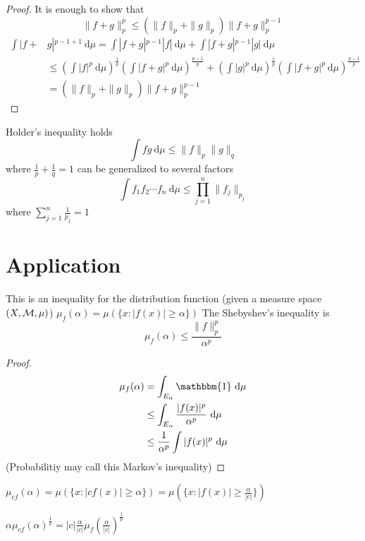 \begin{proof}
  It is enough to show that
  \[\|f+g\|_p^p \le (\|f\|_p + \|g\|_p)\|f+g\|_p^{p-1}\]
  \begin{align*}
    \int |f+&g|^{p-1+1} \ \mathrm{d}\mu = \int |f + g|^{p-1}|f|\ \mathrm{d}\mu + \int |f+g|^{p-1}|g|\ \mathrm{d}\mu \\
    &\le \left(\int |f|^{p}\ \mathrm{d}\mu\right)^{\frac{1}{p}}\left(\int |f+g|^p\ \mathrm{d}\mu\right)^{\frac{p-1}p} + \left(\int |g|^{p}\ \mathrm{d}\mu\right)^{\frac{1}{p}}\left(\int |f+g|^p\ \mathrm{d}\mu\right)^{\frac{p-1}p} \\
    &= (\|f\|_p + \|g\|_p)\|f+g\|_p^{p-1}
  \end{align*}
\end{proof}

\begin{remark}
  Holder's inequality holds
  \[\int fg\ \mathrm{d}\mu \le \|f\|_{p}\|g\|_{q}\]
  where $\frac1p + \frac1{q} = 1$ can be generalized to several factors
  \[\int f_1f_2\dotsm f_n\ \mathrm{d}\mu \le \prod_{j=1}^n \|f_j\|_{p_j}\]
  where $\sum_{j=1}^n \frac1{p_j} = 1$
\end{remark}

\section{Application}
\begin{lemma}
  This is an inequality for the distribution function (given a measure space $(X, \mathcal M, \mu)$) 
  $\mu_f(\alpha) = \mu(\{x : |f(x)| \ge \alpha\})$
  The Shebyshev's inequality is 
  \[\mu_f(\alpha) \le \frac{\|f\|_p^p}{\alpha^p}\]
\end{lemma}
\begin{proof}
  \begin{align*}
    \mu_f(\alpha) &= \int_{E_\alpha} \mathbbm{1} \ \mathrm{d}\mu \\
    &\le \int_{E_\alpha} \frac{|f(x)|^p}{\alpha^p}\ \mathrm{d}\mu \\
    &\le \frac1{\alpha^p}\int |f(x)|^p \ \mathrm{d}\mu \\
  \end{align*} 
  (Probabilitiy may call this Markov's inequality)
\end{proof}

$\mu_{cf}(\alpha) = \mu(\{x : |cf(x)| \ge \alpha\}) = \mu(\{x : |f(x)| \ge \frac{\alpha}{|c|}\})$

$\alpha\mu_{cf}(\alpha)^{\frac1p} = |c|\frac\alpha{|c|}\mu_f\left(\frac\alpha{|c|}\right)^{\frac1p} 
$


